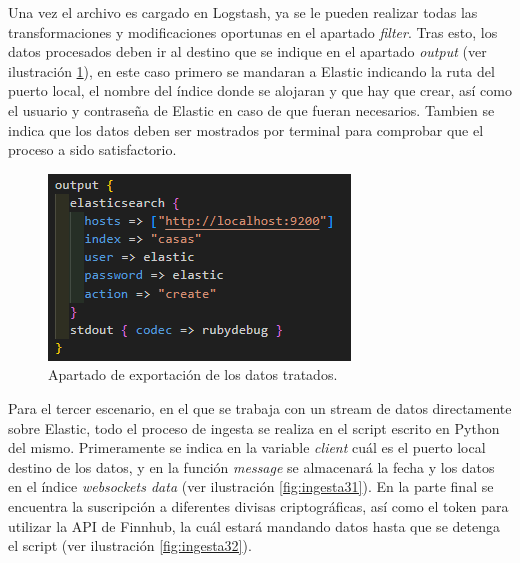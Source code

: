 Una vez el archivo es cargado en Logstash, ya se le pueden realizar todas las transformaciones y modificaciones oportunas en el apartado \textit{filter}. Tras esto, los datos procesados deben ir al destino que se indique en el apartado \textit{output}  (ver ilustración  \ref{fig:ingesta22}), en este caso primero se mandaran a Elastic indicando la ruta del puerto local, el nombre del índice donde se alojaran y que hay que crear, así como el usuario y contraseña de Elastic en caso de que fueran necesarios. Tambien se indica que los datos deben ser mostrados por terminal para comprobar que el proceso a sido satisfactorio.

\begin{figure}
    \centering
    \includegraphics[width=1\linewidth]{img/ingesta2-2.png}
    \caption{Apartado de exportación de los datos tratados.}
    \label{fig:ingesta22}
\end{figure}

Para el tercer escenario, en el que se trabaja con un stream de datos directamente sobre Elastic, todo el proceso de ingesta se realiza en el script escrito en Python del mismo. Primeramente se indica en la variable \textit{client} cuál es el puerto local destino de los datos, y en la función \textit{message} se almacenará la fecha y los datos en el índice \textit{websockets data}  (ver ilustración  \ref{fig:ingesta31}). En la parte final se encuentra la suscripción a diferentes divisas criptográficas, así como el token para utilizar la API de Finnhub, la cuál estará mandando datos hasta que se detenga el script  (ver ilustración  \ref{fig:ingesta32}).

